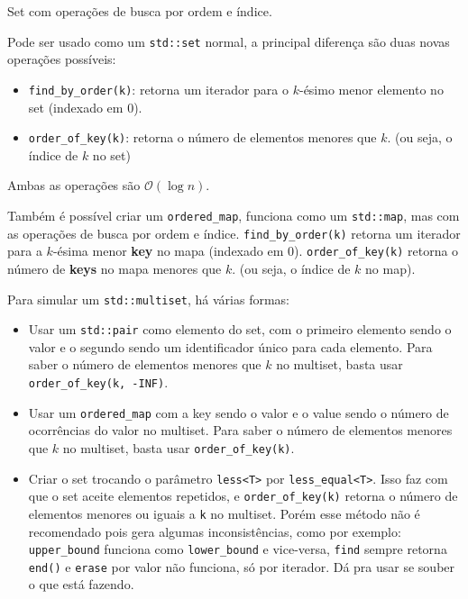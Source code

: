 \documentclass[10pt, a4paper, oneside]{book}
\begin{document}
Set com operações de busca por ordem e índice.



Pode ser usado como um \texttt{std::set} normal, a principal diferença são duas novas operações possíveis:



\begin{itemize}
\item \texttt{find\_by\_order(k)}: retorna um iterador para o $k$-ésimo menor elemento no set (indexado em 0).
\item \texttt{order\_of\_key(k)}: retorna o número de elementos menores que $k$. (ou seja, o índice de $k$ no set)
\end{itemize}



Ambas as operações são $\mathcal{O}(\log n)$.



Também é possível criar um \texttt{ordered\_map}, funciona como um \texttt{std::map}, mas com as operações de busca por ordem e índice. \texttt{find\_by\_order(k)} retorna um iterador para a $k$-ésima menor \textbf{key} no mapa (indexado em 0). \texttt{order\_of\_key(k)} retorna o número de \textbf{keys} no mapa menores que $k$. (ou seja, o índice de $k$ no map).



Para simular um \texttt{std::multiset}, há várias formas:



\begin{itemize}
\item Usar um \texttt{std::pair} como elemento do set, com o primeiro elemento sendo o valor e o segundo sendo um identificador único para cada elemento. Para saber o número de elementos menores que $k$ no multiset, basta usar \texttt{order\_of\_key({k, -INF})}.
\end{itemize}



\begin{itemize}
\item Usar um \texttt{ordered\_map} com a key sendo o valor e o value sendo o número de ocorrências do valor no multiset. Para saber o número de elementos menores que $k$ no multiset, basta usar \texttt{order\_of\_key(k)}.
\end{itemize}



\begin{itemize}
\item Criar o set trocando o parâmetro \texttt{less<T>} por \texttt{less\_equal<T>}. Isso faz com que o set aceite elementos repetidos, e \texttt{order\_of\_key(k)} retorna o número de elementos menores ou iguais a \texttt{k} no multiset. Porém esse método não é recomendado pois gera algumas inconsistências, como por exemplo: \texttt{upper\_bound} funciona como \texttt{lower\_bound} e vice-versa, \texttt{find} sempre retorna \texttt{end()} e \texttt{erase} por valor não funciona, só por iterador. Dá pra usar se souber o que está fazendo.
\end{itemize}
\end{document}
